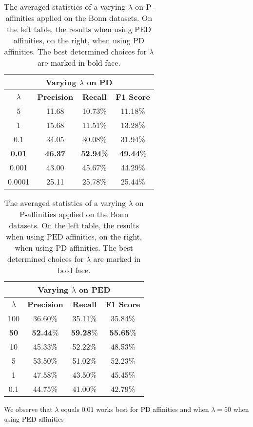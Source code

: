 \begin{table}[H]
\centering
\setlength\tabcolsep{4pt}
\begin{minipage}{0.48\textwidth}
\centering
\begin{tabular}{|c|c|c|c|}
\hline
\multicolumn{4}{|c|}{Varying $\lambda$ on PD} \\ \hline
$\lambda$ & \textbf{Precision} & \textbf{Recall} & \textbf{F1 Score} \\ \hline
5 & 11.68 & 10.73\% & 11.18\%  \\ \hline
1 & 15.68 & 11.51\% & 13.28\%  \\ \hline
0.1 & 34.05 & 30.08\% & 31.94\%  \\ \hline
\textbf{0.01} & \textbf{46.37} & \textbf{52.94}\% & \textbf{49.44}\%  \\ \hline
0.001 & 43.00 & 45.67\% & 44.29\%  \\ \hline
0.0001 & 25.11 & 25.78\% & 25.44\%  \\ \hline
\end{tabular}
\end{minipage}%
\hfill
\begin{minipage}{0.48\textwidth}
\centering
\begin{tabular}{|c|c|c|c|}
\hline
\multicolumn{4}{|c|}{Varying $\lambda$ on PED}                        \\ \hline
$\lambda$ & \textbf{Precision} & \textbf{Recall} & \textbf{F1 Score} \\ \hline
100 & 36.60\% & 35.11\% & 35.84\%  \\ \hline
\textbf{50} & \textbf{52.44}\% & \textbf{59.28}\% & \textbf{55.65}\%  \\ \hline
10 & 45.33\% & 52.22\% & 48.53\%  \\ \hline
5 & 53.50\% & 51.02\% & 52.23\%  \\ \hline
1 & 47.58\% & 43.50\% & 45.45\%  \\ \hline
0.1 & 44.75\% & 41.00\% & 42.79\%  \\ \hline
\end{tabular}
\end{minipage}
\caption[Experiment Varying $\lambda$]{The averaged statistics of a varying $\lambda$ on P-affinities applied on the Bonn datasets. On the left table, the results when using PED affinities, on the right, when using PD affinities. The best determined choices for $\lambda$ are marked in bold face.}
\label{tab:varying_lambda_experiment}
\end{table}
We observe that $\lambda$ equals $0.01$ works best for PD affinities and when $\lambda = 50$ when using PED affinities \\ \\

